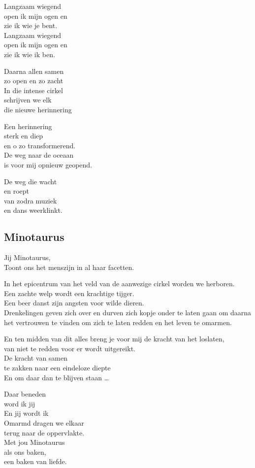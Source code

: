 \documentclass[
  11pt,
]{book}
\begin{document}
Langzaam wiegend\\
open ik mijn ogen en\\
zie ik wie je bent.\\
Langzaam wiegend\\
open ik mijn ogen en\\
zie ik wie ik ben.

Daarna allen samen\\
zo open en zo zacht\\
In die intense cirkel\\
schrijven we elk\\
die nieuwe herinnering

Een herinnering\\
sterk en diep\\
en o zo transformerend.\\
De weg naar de oceaan\\
is voor mij opnieuw geopend.

De weg die wacht\\
en roept\\
van zodra muziek\\
en dans weerklinkt.

\hypertarget{minotaurus}{%
\subsection*{Minotaurus}\label{minotaurus}}

Jij Minotaurus,\\
Toont ons het menszijn in al haar facetten.

In het epicentrum van het veld van de aanwezige cirkel worden we herboren.\\
Een zachte welp wordt een krachtige tijger.\\
Een beer danst zijn angsten voor wilde dieren.\\
Drenkelingen geven zich over en durven zich kopje onder te laten gaan om daarna het vertrouwen te vinden om zich te laten redden en het leven te omarmen.

En ten midden van dit alles breng je voor mij de kracht van het loslaten,\\
van niet te redden voor er wordt uitgereikt.\\
De kracht van samen\\
te zakken naar een eindeloze diepte\\
En om daar dan te blijven staan \ldots{}

Daar beneden\\
word ik jij\\
En jij wordt ik\\
Omarmd dragen we elkaar\\
terug naar de oppervlakte.\\
Met jou Minotaurus\\
als ons baken,\\
een baken van liefde.

  
\end{document}
